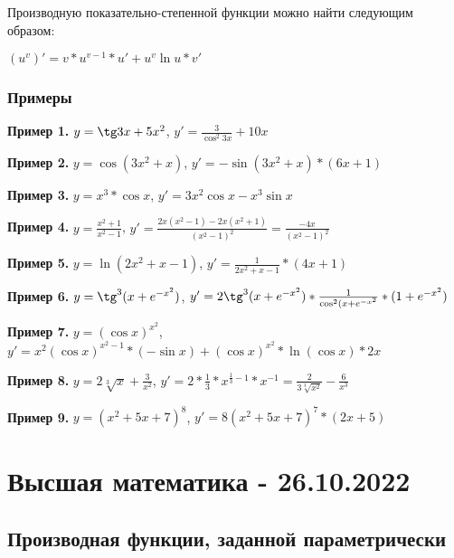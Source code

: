 \documentclass{article}
\begin{document}
\begin{flushleft}
Производную показательно-степенной функции можно найти следующим образом:

$(u^v)' = v * u^{v - 1} * u' + u^v \ln u * v'$

\subsubsection{Примеры}

\textbf{Пример 1.} $y = \tg 3x + 5x^2$, $y' = \frac{3}{\cos^{2} 3x} + 10x$

\hfill

\textbf{Пример 2.} $y = \cos (3x^2 + x)$, $y' = -\sin(3x^2 + x) * (6x + 1)$

\hfill

\textbf{Пример 3.} $y = x^3 * \cos x$, $y' = 3x^2 \cos x - x^3 \sin x$

\hfill

\textbf{Пример 4.} $y = \frac{x^2 + 1}{x^2 - 1}$, $y' = \frac{2x(x^2 - 1) - 2x(x^2 + 1)}{(x^2 - 1)^2} = \frac{-4x}{(x^2 - 1)^2}$

\hfill

\textbf{Пример 5.} $y = \ln (2x^2 + x - 1)$, $y' = \frac{1}{2x^2 + x - 1} * (4x + 1)$

\hfill

\textbf{Пример 6.} $y = \tg^3 (x + e^{-x^2})$, $y' = 2 \tg^3 (x + e^{-x^2}) * \frac{1}{\cos^2(x+e^{-x^2}} * (1 + e^{-x^2})$

\hfill

\textbf{Пример 7. } $y = (\cos x)^{x^2}$, $y' = x^2 (\cos x)^{x^2 - 1} * (-\sin x) + (\cos x)^{x^2} * \ln (\cos x) * 2x$

\hfill

\textbf{Пример 8.} $y = 2 \sqrt[3]{x} + \frac{3}{x^2}$, $y' = 2 * \frac{1}{3} * x^{\frac{1}{3} - 1} * x^{-1} = \frac{2}{3\sqrt[3]{x^2}} - \frac{6}{x^3}$

\hfill

\textbf{Пример 9.} $y = (x^2 + 5x + 7)^{8}$, $y' = 8(x^2 + 5x + 7)^{7} * (2x + 5)$

\end{flushleft}

\pagebreak
\section{Высшая математика - 26.10.2022}

\subsection{Производная функции, заданной параметрически}
\end{document}
